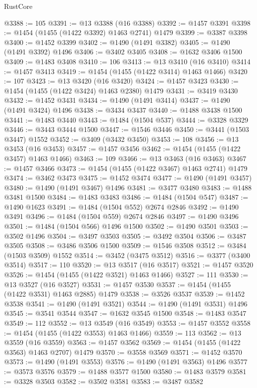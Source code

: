 \begin{lexlean}{RustCore}
\begin{coremodule}
@3388 := 105
@3391 := @13 @3388 (@16 @3388)
@3392 := @1457 @3391
@3398 := @1454 (@1455 (@1422 @3392) @1463 @2741) @1479
@3399 := @3387 @3398
@3400 := @1452 @3399
@3402 := @1490 (@1491 @3382)
@3405 := @1490 (@1491 @3392) @1496
@3406 := @3402 @3405
@3408 := @1632 @3406 @1500
@3409 := @1483 @3408
@3410 := 106
@3413 := @13 @3410 (@16 @3410)
@3414 := @1457 @3413
@3419 := @1454 (@1455 (@1422 @3414) @1463 @1466)
@3420 := 107
@3423 := @13 @3420 (@16 @3420)
@3424 := @1457 @3423
@3430 := @1454 (@1455 (@1422 @3424) @1463 @2380) @1479
@3431 := @3419 @3430
@3432 := @1452 @3431
@3434 := @1490 (@1491 @3414)
@3437 := @1490 (@1491 @3424) @1496
@3438 := @3434 @3437
@3440 := @1488 @3438 @1500
@3441 := @1483 @3440
@3443 := @1484 (@1504 @537)
@3444 := @3328 @3329
@3446 := @3443 @3444 @1500
@3447 := @1546 @3446
@3450 := @3441 (@1503 @3447) @1552
@3452 := @3409 (@3432 @3450)
@3453 := 108
@3456 := @13 @3453 (@16 @3453)
@3457 := @1457 @3456
@3462 := @1454 (@1455 (@1422 @3457) @1463 @1466)
@3463 := 109
@3466 := @13 @3463 (@16 @3463)
@3467 := @1457 @3466
@3473 := @1454 (@1455 (@1422 @3467) @1463 @2741) @1479
@3474 := @3462 @3473
@3475 := @1452 @3474
@3477 := @1490 (@1491 @3457)
@3480 := @1490 (@1491 @3467) @1496
@3481 := @3477 @3480
@3483 := @1488 @3481 @1500
@3484 := @1483 @3483
@3486 := @1484 (@1504 @547)
@3487 := @1490 @1623
@3491 := @1484 (@1504 @552) @2674 @2846
@3492 := @1490 @3491
@3496 := @1484 (@1504 @559) @2674 @2846
@3497 := @1490 @3496
@3501 := @1484 (@1504 @566) @1496 @1500
@3502 := @1490 @3501
@3503 := @3502 @1496
@3504 := @3497 @3503
@3505 := @3492 @3504
@3506 := @3487 @3505
@3508 := @3486 @3506 @1500
@3509 := @1546 @3508
@3512 := @3484 (@1503 @3509) @1552
@3514 := @3452 (@3475 @3512)
@3516 := @3377 (@3400 @3514)
@3517 := 110
@3520 := @13 @3517 (@16 @3517)
@3521 := @1457 @3520
@3526 := @1454 (@1455 (@1422 @3521) @1463 @1466)
@3527 := 111
@3530 := @13 @3527 (@16 @3527)
@3531 := @1457 @3530
@3537 := @1454 (@1455 (@1422 @3531) @1463 @2885) @1479
@3538 := @3526 @3537
@3539 := @1452 @3538
@3541 := @1490 (@1491 @3521)
@3544 := @1490 (@1491 @3531) @1496
@3545 := @3541 @3544
@3547 := @1632 @3545 @1500
@3548 := @1483 @3547
@3549 := 112
@3552 := @13 @3549 (@16 @3549)
@3553 := @1457 @3552
@3558 := @1454 (@1455 (@1422 @3553) @1463 @1466)
@3559 := 113
@3562 := @13 @3559 (@16 @3559)
@3563 := @1457 @3562
@3569 := @1454 (@1455 (@1422 @3563) @1463 @2707) @1479
@3570 := @3558 @3569
@3571 := @1452 @3570
@3573 := @1490 (@1491 @3553)
@3576 := @1490 (@1491 @3563) @1496
@3577 := @3573 @3576
@3579 := @1488 @3577 @1500
@3580 := @1483 @3579
@3581 := @3328 @3503
@3582 := @3502 @3581
@3583 := @3487 @3582

\end{coremodule}
\end{lexlean}
